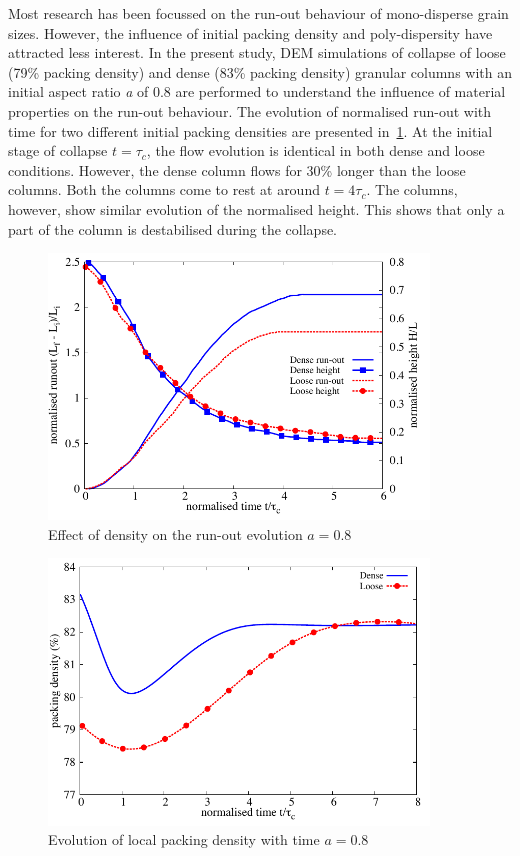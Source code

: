 Most research has been focussed on the run-out behaviour of mono-disperse 
grain sizes. However, the influence of initial packing density and 
poly-dispersity have attracted less interest. In the present study, DEM 
simulations of collapse of loose (79\% packing density) and dense (83\% 
packing density) granular columns with an initial aspect ratio \textit{a} of 
0.8 are performed to understand the influence of material properties on the 
run-out behaviour. The evolution of normalised run-out with time for two 
different initial packing densities are presented 
in~\cref{fig:runout_height_dense_r18}. At the initial 
stage of collapse $t=\tau_c$, the flow evolution is identical in both dense and 
loose conditions. However, the dense column flows for 30\% longer than the 
loose columns. Both the columns come to rest at around $t = 4\tau_c$. The 
columns, however, show similar evolution of the normalised height. This shows 
that only a part of the column is destabilised during the collapse.
\begin{figure}[h]
\centering
\includegraphics[width=0.9\textwidth]{runout_height_dense_r18}
\caption{Effect of density on the run-out evolution $a = 0.8$}
\label{fig:runout_height_dense_r18}
\end{figure}

\begin{figure}[h]
\centering
\includegraphics[width=0.9\textwidth]{voro_r18}
\caption{Evolution of local packing density with time $a = 0.8$}
\label{fig:voro_r18}
\end{figure}

